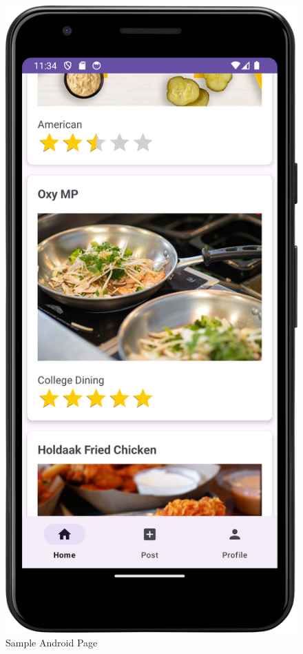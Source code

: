 \documentclass[10pt,twocolumn]{article}
\begin{document}
    \begin{figure}
    \centering
    \includegraphics[width=\linewidth]{SampleAndroidPage.png}
    \caption{Sample Android Page}
    \label{fig:my_label}
   \end{figure}
\end{document}
